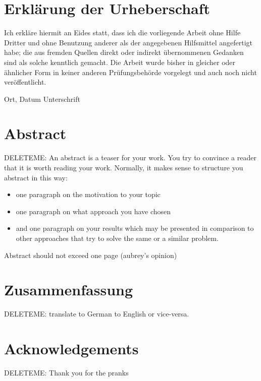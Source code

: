 \chapter*{Erkl{\"a}rung der Urheberschaft}
Ich erkläre hiermit an Eides statt, dass ich die vorliegende Arbeit ohne Hilfe Dritter und ohne Benutzung anderer als der angegebenen Hilfsmittel angefertigt habe; die aus fremden Quellen direkt oder indirekt übernommenen Gedanken sind als solche kenntlich gemacht. Die Arbeit wurde bisher in gleicher oder ähnlicher Form in keiner anderen Prüfungsbehörde vorgelegt und auch noch nicht veröffentlicht.


\vspace{4cm}

Ort, Datum \hfill Unterschrift

\newpage
\chapter*{Abstract}
DELETEME: An abstract is a teaser for your work. You try to convince a reader that it is worth reading your work. Normally, it makes sense to structure you abstract in this way: 
\begin{itemize}
\item one paragraph on the motivation to your topic
\item one paragraph on what approach you have chosen
\item and one paragraph on your results which may be presented in comparison to other approaches that try to solve the same or a similar problem.
\end{itemize}
Abstract should not exceed one page (aubrey's opinion)

\newpage
\chapter*{Zusammenfassung}
DELETEME: translate to German to English or vice-versa.

\newpage
\chapter*{Acknowledgements}
DELETEME: Thank you for the pranks
